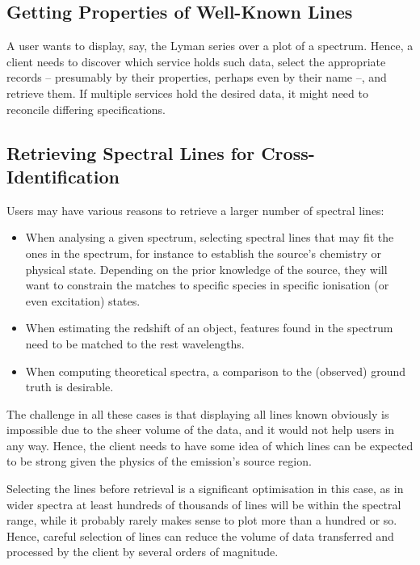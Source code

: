 \documentclass[11pt,a4paper]{ivoa}
\begin{document}
\subsection{Getting Properties of Well-Known Lines}

A user wants to display, say, the Lyman series over a plot of a
spectrum.  Hence, a client needs to discover which service holds such
data, select the appropriate records -- presumably by their properties,
perhaps even by their name --, and retrieve them.  If multiple services
hold the desired data, it might need to reconcile differing
specifications.


\subsection{Retrieving Spectral Lines for Cross-Identification}

Users may have various reasons to retrieve a larger number of spectral
lines:

\begin{itemize}
\item When analysing a given spectrum, selecting spectral lines that may
fit the ones in the spectrum, for instance to establish the source's
chemistry or physical state.  Depending on the prior knowledge of the
source, they will want to constrain the matches to specific species in
specific ionisation (or even excitation) states.

\item When estimating the redshift of an object, features found in the
spectrum need to be matched to the rest wavelengths.

\item When computing theoretical spectra, a comparison to the (observed)
ground truth is desirable.
\end{itemize}

The challenge in all these cases is that displaying all lines
known obviously is impossible due to the sheer volume of the data,
and it would not help users in any way.
Hence, the client needs to have some idea of which lines can be expected
to be strong given the physics of the emission's source region.

Selecting the lines before retrieval is a significant optimisation in
this case, as in wider spectra at least hundreds of thousands of lines
will be within the spectral range, while it probably rarely makes sense
to plot more than a hundred or so.  Hence, careful selection of lines
can reduce the volume of data transferred and processed by the client by
several orders of magnitude.
\end{document}
